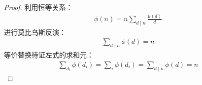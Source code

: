\begin{proof}
    利用恒等关系：
    \begin{align*}
        \phi(n)=n\sum_{d\mid n}\frac{\mu(d)}{d}
    \end{align*}
    进行莫比乌斯反演：
    \begin{align*}
        \sum_{d\mid n}\phi(d)=n
    \end{align*}
    等价替换待证左式的求和元：
    \begin{align*}
        \sum_{d_i}\phi(d_i) = \sum_{i}\phi(d_i)= \sum_{d\mid n}\phi(d)=n
    \end{align*}
\end{proof}